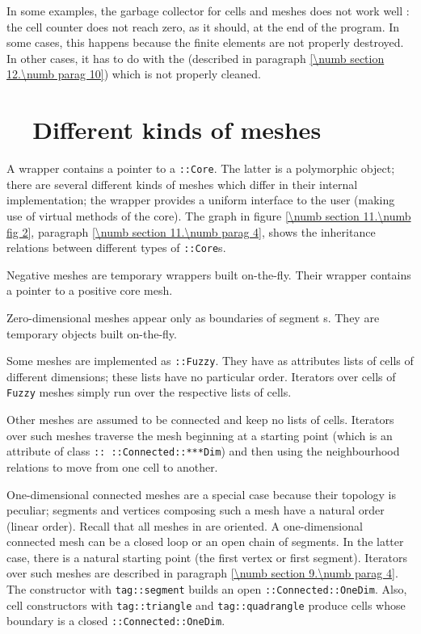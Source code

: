 In some examples, the garbage collector for cells and meshes does not work well :
the cell counter does not reach zero, as it should, at the end of the program.
In some cases, this happens because the finite elements are not properly destroyed.
In other cases, it has to do with the {\small\tt{}} (described in
paragraph \ref{\numb section 12.\numb parag 10}) which is not properly cleaned.


\section{~~Different kinds of meshes}\label{\numb section 11.\numb parag 6}   

A {\small\tt{}} wrapper contains a pointer to a {\small\tt{}::Core}.
The latter is a polymorphic object; there are several different kinds of meshes
which differ in their internal implementation; the wrapper provides a uniform interface
to the user (making use of virtual methods of the core).
The graph in figure \ref{\numb section 11.\numb fig 2}, paragraph
\ref{\numb section 11.\numb parag 4}, shows the inheritance relations between different types
of {\small\tt{}::Core}s.

Negative meshes are temporary wrappers built on-the-fly.
Their wrapper contains a pointer to a positive core mesh.

Zero-dimensional meshes appear only as boundaries of segment {\small\tt{}}s.
They are temporary objects built on-the-fly.

Some meshes are implemented as {\small\tt{}::Fuzzy}.
They have as attributes lists of cells of different dimensions;
these lists have no particular order.
Iterators over cells of {\small\tt Fuzzy} meshes simply run over the respective lists of cells.

Other meshes are assumed to be connected and keep no lists of cells.
Iterators over such meshes traverse the mesh beginning at a starting point (which is an attribute
of class {\small\tt{}:: ::Connected::***Dim}) and then using the neighbourhood relations
to move from one cell to another.

One-dimensional connected meshes are a special case because their topology is peculiar;
segments and vertices composing such a mesh have a natural order (linear order).
Recall that all meshes in {\maniFEM} are oriented.
A one-dimensional connected mesh can be a closed loop or an open chain of segments.
In the latter case, there is a natural starting point (the first vertex or first segment).
Iterators over such meshes are described in paragraph \ref{\numb section 9.\numb parag 4}.
The {\small\tt{}} constructor with {\small\tt \textcolor{tag}{tag}::segment}
builds an open {\small\tt{}::Connected::OneDim}.
Also, cell constructors with {\small\tt \textcolor{tag}{tag}::triangle} and
{\small\tt \textcolor{tag}{tag}::quadrangle} produce cells
whose boundary is a closed {\small\tt{}::Connected::OneDim}.

